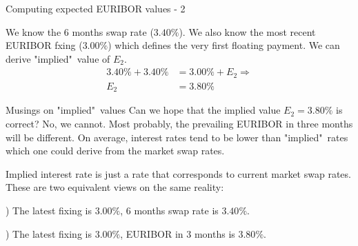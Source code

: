 \documentclass{beamer}
\begin{document}
\begin{frame}{Computing expected EURIBOR values - 2}
\centering
{}

\justify
We know the 6 months swap rate ($3.40\%$). We also know the most recent EURIBOR fxing ($3.00\%$) which defines the very first floating payment. We can derive "implied"\ value of $E_2$.
\begin{align*}
3.40\% + 3.40\% &= 3.00\% + E_2 \Rightarrow \\
E_2 &= 3.80\%
\end{align*}

\end{frame}



\begin{frame}{Musings on "implied"\ values}
\justify
Can we hope that the implied value $E_2=3.80\%$ is correct? No, we cannot. Most probably, the prevailing EURIBOR in three months will be different. On average, interest rates tend to be lower than "implied"\ rates which one could derive from the market swap rates.

\justify
Implied interest rate is just a rate that corresponds to current market swap rates. These are two equivalent views on the same reality:

) The latest fixing is $3.00\%$, 6 months swap rate is $3.40\%$.

) The latest fixing is $3.00\%$, EURIBOR in 3 months is $3.80\%$.
\end{frame}
\end{document}
